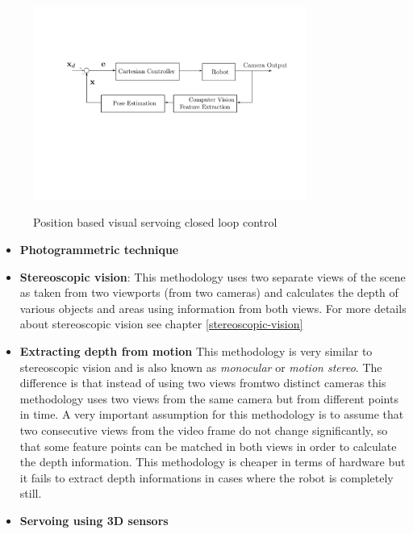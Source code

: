 \begin{center}
\begin{figure}[H]
\centering
\includegraphics[width=0.8\textwidth]{images/visual-servoing-position-based.png}\\
\caption{Position based visual servoing closed loop control}
\end{figure}
\end{center}

\begin{itemize}
\item \textbf{Photogrammetric technique}
\item \textbf{Stereoscopic vision}: This methodology uses two separate views of the scene as taken from two viewports (from two cameras) 
and calculates the depth of various objects and areas using information from both views. For more details about stereoscopic vision see chapter \ref{stereoscopic-vision}
\item \textbf{Extracting depth from motion} This methodology is very similar to stereoscopic vision and is also known as \textit{monocular} or \textit{motion stereo}. The difference is that instead of using two views fromtwo distinct cameras this methodology 
uses two views from the same camera but from different points in time. A very important assumption for this methodology is to assume that two consecutive views from the video frame do not change significantly, so that some feature points can be matched in both views in order to calculate the depth information. This methodology 
is cheaper in terms of hardware but it fails to extract depth informations in cases where the robot is completely still.
\item \textbf{Servoing using 3D sensors}
\end{itemize}

